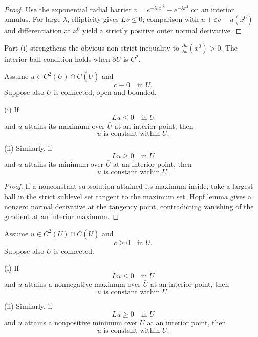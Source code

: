 \begin{proof}
\sketch Use the exponential radial barrier $v=e^{-\lambda|x|^2}-e^{-\lambda r^2}$ on an interior annulus. For large $\lambda$, ellipticity gives $Lv\le0$; comparison with $u+\varepsilon v-u(x^0)$ and differentiation at $x^0$ yield a strictly positive outer normal derivative.
\end{proof}

\begin{remark}
\label{rem:hopfs-lemma-strict-inequality}

Part (i) strengthens the obvious non-strict inequality to $\frac{\partial u}{\partial\nu}(x^0)>0$. The interior ball condition holds when $\partial U$ is $C^2$.
\end{remark}

\begin{theorem}
\label{thm:strong-maximum-principle-c-zero}

Assume $u \in C^2(U) \cap C(\bar U)$ and
$$c \equiv 0 \quad \text{in } U.$$
Suppose also $U$ is connected, open and bounded.

(i) If
$$Lu \leq 0 \quad \text{in } U$$
and $u$ attains its maximum over $\bar U$ at an interior point, then
$$u \text{ is constant within } U.$$

(ii) Similarly, if
$$Lu \geq 0 \quad \text{in } U$$
and $u$ attains its minimum over $\bar U$ at an interior point, then
$$u \text{ is constant within } U.$$
\end{theorem}

\begin{proof}
\sketch If a nonconstant subsolution attained its maximum inside, take a largest ball in the strict sublevel set tangent to the maximum set. Hopf lemma gives a nonzero normal derivative at the tangency point, contradicting vanishing of the gradient at an interior maximum.
\end{proof}

\begin{theorem}
\label{thm:strong-maximum-principle-c-nonneg}

Assume $u \in C^2(U) \cap C(\bar U)$ and
$$c \geq 0 \quad \text{in } U.$$
Suppose also $U$ is connected.

(i) If
$$Lu \leq 0 \quad \text{in } U$$
and $u$ attains a nonnegative maximum over $\bar U$ at an interior point, then
$$u \text{ is constant within } U.$$

(ii) Similarly, if
$$Lu \geq 0 \quad \text{in } U$$
and $u$ attains a nonpositive minimum over $\bar U$ at an interior point, then
$$u \text{ is constant within } U.$$

\end{theorem}

